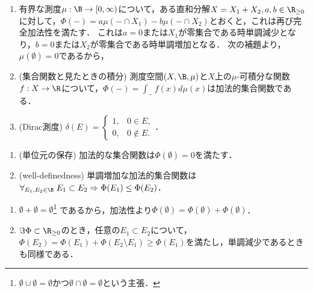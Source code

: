 \documentclass[uplatex, dvipdfmx]{jsreport}
\begin{document}
\begin{example}[加法的集合関数の表現]\mbox{}\label{exp-representation-of-additive-set-function}
    \begin{enumerate}
        \item 有界な測度$\mu:\B\to[0,\infty)$について，ある直和分解$X=X_1+X_2,a,b\in\R_{\ge 0}$に対して，$\Phi(-)=a\mu(-\cap X_1)-b\mu(-\cap X_2)$とおくと，これは再び完全加法性を満たす．
        これは$a=0$または$X_1$が零集合である時単調減少となり，$b=0$または$X_2$が零集合である時単調増加となる．
        次の補題より，$\mu(\emptyset)=0$であるから，
        \item (集合関数と見たときの積分) 測度空間$(X,\B,\mu)$と$X$上の$\mu$-可積分な関数$f:X\to\R$について，$\Phi(-)=\int_{-}f(x)d\mu(x)$は加法的集合関数である．
        \item (Dirac測度) $\delta(E)=\begin{cases}1,&0\in E,\\0,&0\notin E.\end{cases}$．
    \end{enumerate}
\end{example}

\begin{lemma}\mbox{}\label{lemma-additive-set-function}
    \begin{enumerate}
        \item (単位元の保存) 加法的な集合関数は$\Phi(\emptyset)=0$を満たす．
        \item (well-definedness) 単調増加な加法的集合関数は$\forall_{E_1,E_2\in\B}\;E_1\subset E_2\Rightarrow\Phi(E_1)\le\Phi(E_2)$．
    \end{enumerate}
\end{lemma}
\begin{Proof}\mbox{}
    \begin{enumerate}
        \item $\emptyset+\emptyset=\emptyset$\footnote{$\emptyset\cup\emptyset=\emptyset$かつ$\emptyset\cap\emptyset=\emptyset$という主張．}
        であるから，加法性より$\Phi(\emptyset)=\Phi(\emptyset)+\Phi(\emptyset)$．
        \item $\Im\Phi\subset\R_{\ge 0}$のとき，任意の$E_1\subset E_2$について，$\Phi(E_2)=\Phi(E_1)+\Phi(E_2\setminus E_1)\ge\Phi(E_1)$を満たし，単調減少であるときも同様である．
    \end{enumerate}
\end{Proof}
\end{document}
